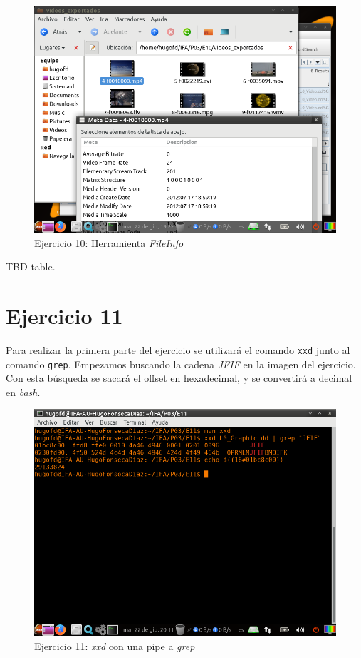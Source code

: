 \documentclass[11pt]{article}
\begin{document}
\begin{figure}[H]
    \caption{Ejercicio 10: Herramienta \textit{FileInfo}}
    \centering
    \includegraphics[scale=0.7]{e10-6.png}
\end{figure}

TBD table.

\section{Ejercicio 11}
Para realizar la primera parte del ejercicio se utilizará el comando \verb|xxd| junto al comando \verb|grep|. Empezamos buscando la cadena \textit{JFIF} en la imagen del ejercicio. Con esta búsqueda se sacará el offset en hexadecimal, y se convertirá a decimal en \textit{bash}.

\begin{figure}[H]
    \caption{Ejercicio 11: \textit{xxd} con una pipe a \textit{grep}}
    \centering
    \includegraphics[scale=0.7]{e11-1.png}
\end{figure}
\end{document}
